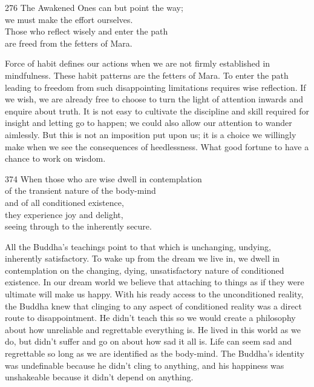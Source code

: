 
\begin{dhpVerse}{276}
\label{dhp-276}
The Awakened Ones can but point the way;\\
we must make the effort ourselves.\\
Those who reflect wisely and enter the path\\
are freed from the fetters of Mara.
\end{dhpVerse}

\begin{dhpRefl}
  Force of habit defines our actions when we are not firmly established in
  mindfulness. These habit patterns are the fetters of Mara. To enter the path
  leading to freedom from such disappointing limitations requires wise
  reflection. If we wish, we are already free to choose to turn the light of
  attention inwards and enquire about truth. It is not easy to cultivate the
  discipline and skill required for insight and letting go to happen; we could
  also allow our attention to wander aimlessly. But this is not an imposition
  put upon us; it is a choice we willingly make when we see the consequences of
  heedlessness. What good fortune to have a chance to work on wisdom.
\end{dhpRefl}


\begin{dhpVerse}{374}
\label{dhp-374}
When those who are wise dwell in contemplation\\
of the transient nature of the body-mind\\
and of all conditioned existence,\\
they experience joy and delight,\\
seeing through to the inherently secure.
\end{dhpVerse}

\begin{dhpRefl}
  All the Buddha's teachings point to that which is unchanging, undying,
  inherently satisfactory. To wake up from the dream we live in, we dwell in
  contemplation on the changing, dying, unsatisfactory nature of conditioned
  existence. In our dream world we believe that attaching to things as if they
  were ultimate will make us happy. With his ready access to the unconditioned
  reality, the Buddha knew that clinging to any aspect of conditioned reality
  was a direct route to disappointment. He didn't teach this so we would create
  a philosophy about how unreliable and regrettable everything is. He lived in
  this world as we do, but didn't suffer and go on about how sad it all is. Life
  can seem sad and regrettable so long as we are identified as the body-mind.
  The Buddha's identity was undefinable because he didn't cling to anything, and
  his happiness was unshakeable because it didn't depend on anything.
\end{dhpRefl}


